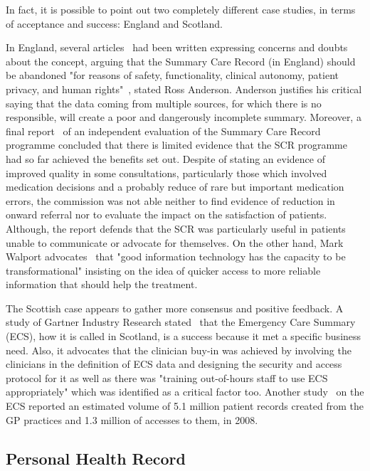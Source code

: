 In fact, it is possible to point out two completely different case studies, in terms of acceptance and success: England and Scotland. 

In England, several articles~\citep{Anderson2010, Coiera2011, Greenhalgh2010} had been written expressing concerns and doubts about the concept, arguing that the Summary Care Record (in England) should be abandoned "for reasons of safety, functionality, clinical autonomy, patient privacy, and human rights"~\citep{Anderson2010}, stated Ross Anderson. Anderson justifies his critical saying that the data coming from multiple sources, for which there is no responsible, will create a poor and dangerously incomplete summary. Moreover, a final report~\citep{Stramer2010} of an independent evaluation of the Summary Care Record programme concluded that there is limited evidence that the SCR programme had so far achieved the benefits set out. Despite of stating an evidence of improved quality in some consultations, particularly those which involved medication decisions and a probably reduce of rare but important medication errors, the commission was not able neither to find evidence of reduction in onward referral nor to evaluate the impact on the satisfaction of patients. Although, the report defends that the SCR was particularly useful in patients unable to communicate or advocate for themselves. On the other hand, Mark Walport advocates~\citep{Walport2010} that "good information technology has the capacity to be transformational" insisting on the idea of quicker access to more reliable information that should help the treatment.

The Scottish case appears to gather more consensus and positive feedback. A study of Gartner Industry Research stated~\citep{Research2007} that the Emergency Care Summary (ECS), how it is called in Scotland, is a success because it met a specific business need. Also, it advocates that the clinician buy-in was achieved by involving the clinicians in the definition of ECS data and designing the security and access protocol for it as well as there was "training out-of-hours staff to use ECS appropriately" which was identified as a critical factor too. Another study~\citep{Jones2008} on the ECS reported an estimated volume of 5.1 million patient records created from the GP practices and 1.3 million of accesses to them, in 2008.

\subsection{Personal Health Record}


